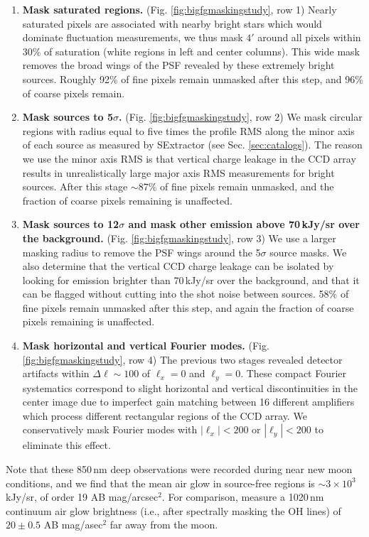 \documentclass[numberedappendix]{emulateapj}
\begin{document}
\begin{enumerate}
	\item \textbf{Mask saturated regions.} (Fig. \ref{fig:bigfgmaskingstudy}, row 1) Nearly saturated pixels are associated with nearby bright stars which would dominate fluctuation measurements, we thus mask $4'$ around all pixels within 30\% of saturation (white regions in left and center columns). This wide mask removes the broad wings of the PSF revealed by these extremely bright sources. Roughly 92\% of fine pixels remain unmasked after this step, and 96\% of coarse pixels remain.
	\item \textbf{Mask sources to 5$\sigma$.} (Fig. \ref{fig:bigfgmaskingstudy}, row 2) We mask circular regions with radius equal to five times the profile RMS along the minor axis of each source as measured by SExtractor (see Sec. \ref{sec:catalogs}). The reason we use the minor axis RMS is that vertical charge leakage in the CCD array results in unrealistically large major axis RMS measurements for bright sources. After this stage $\sim87$\% of fine pixels remain unmasked, and the fraction of coarse pixels remaining is unaffected.
	\item \textbf{Mask sources to 12$\sigma$ and mask other emission above 70\,kJy/sr over the background.} (Fig. \ref{fig:bigfgmaskingstudy}, row 3) We use a larger masking radius to remove the PSF wings around the 5$\sigma$ source masks. We also determine that the vertical CCD charge leakage can be isolated by looking for emission brighter than 70\,kJy/sr over the background, and that it can be flagged without cutting into the shot noise between sources. 58\% of fine pixels remain unmasked after this step, and again the fraction of coarse pixels remaining is unaffected.
	\item \textbf{Mask horizontal and vertical Fourier modes.} (Fig. \ref{fig:bigfgmaskingstudy}, row 4) The previous two stages revealed detector artifacts within $\Delta\ell \sim100$ of $\ell_x=0$ and $\ell_y=0$. These compact Fourier systematics correspond to slight horizontal and vertical discontinuities in the center image due to imperfect gain matching between 16 different amplifiers which process different rectangular regions of the CCD array. We conservatively mask Fourier modes with $|\ell_x|<200$ or $|\ell_y|<200$ to eliminate this effect.
\end{enumerate}

Note that these 850\,nm deep observations were recorded during near new moon conditions, and we find that the mean air glow in source-free regions is $\sim3\times10^3$ kJy/sr, of order 19 AB mag/arcsec$^2$. For comparison, \citet{sullivan12} measure a 1020\,nm continuum air glow brightness (i.e., after spectrally masking the OH lines) of $20\pm0.5$ AB mag/asec$^2$ far away from the moon. 
\end{document}
